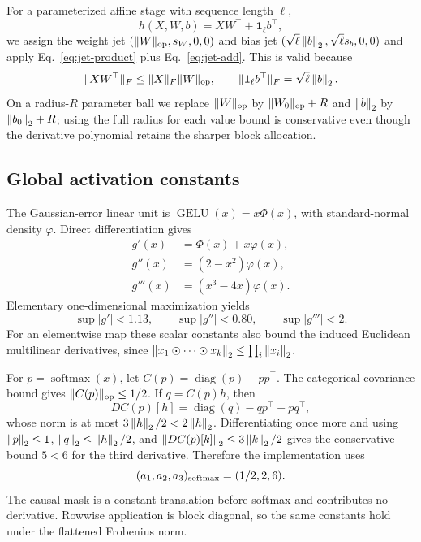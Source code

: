 For a parameterized affine stage with sequence length $\ell$,
\begin{equation}
 h(X,W,b)=XW^\top+\mathbf 1_\ell b^\top,
 \label{eq:affine-stage}
\end{equation}
we assign the weight jet $(\lVert W\rVert_{\rm op},s_W,0,0)$ and bias jet
$(\sqrt\ell\left\lVert b\right\rVert_2,\sqrt\ell s_b,0,0)$ and apply
Eq.~\eqref{eq:jet-product} plus Eq.~\eqref{eq:jet-add}.  This is valid because
\begin{equation}
 \lVert XW^\top\rVert_F\le\lVert X\rVert_F\lVert W\rVert_{\rm op},\qquad
 \lVert\mathbf 1_\ell b^\top\rVert_F=\sqrt\ell\left\lVert b\right\rVert_2.
 \label{eq:affine-norms}
\end{equation}
On a radius-$R$ parameter ball we replace $\lVert W\rVert_{\rm op}$ by
$\lVert W_0\rVert_{\rm op}+R$ and $\left\lVert b\right\rVert_2$ by $\left\lVert b_0\right\rVert_2+R$; using the full
radius for each value bound is conservative even though the derivative
polynomial retains the sharper block allocation.

\subsection{Global activation constants}

The Gaussian-error linear unit is
$\operatorname{GELU}(x)=x\Phi(x)$, with standard-normal density $\varphi$.
Direct differentiation gives
\begin{align}
g'(x)&=\Phi(x)+x\varphi(x),\nonumber\\
g''(x)&=(2-x^2)\varphi(x),\nonumber\\
g'''(x)&=(x^3-4x)\varphi(x).
\end{align}
Elementary one-dimensional maximization yields
\begin{equation}
 \sup|g'|<1.13,\qquad \sup|g''|<0.80,\qquad \sup|g'''|<2.
 \label{eq:gelu-constants}
\end{equation}
For an elementwise map these scalar constants also bound the induced
Euclidean multilinear derivatives, since
$\left\lVert x_1\odot\cdots\odot x_k\right\rVert_2\le\prod_i\left\lVert x_i\right\rVert_2$.

For $p=\operatorname{softmax}(x)$, let
$C(p)=\operatorname{diag}(p)-pp^\top$.  The categorical covariance bound gives
$\lVert C(p)\rVert_{\rm op}\le1/2$.  If $q=C(p)h$, then
\begin{equation}
 DC(p)[h]=\operatorname{diag}(q)-qp^\top-pq^\top,
\end{equation}
whose norm is at most $3\left\lVert h\right\rVert_2/2<2\left\lVert h\right\rVert_2$.  Differentiating once more and
using $\left\lVert p\right\rVert_2\le1$, $\left\lVert q\right\rVert_2\le\left\lVert h\right\rVert_2/2$, and
$\left\lVert DC(p)[k]\right\rVert_2\le3\left\lVert k\right\rVert_2/2$ gives the conservative bound $5<6$ for the
third derivative.  Therefore the implementation uses
\begin{equation}
 (a_1,a_2,a_3)_{\rm softmax}=(1/2,2,6).
 \label{eq:softmax-constants}
\end{equation}
The causal mask is a constant translation before softmax and contributes no
derivative.  Rowwise application is block diagonal, so the same constants hold
under the flattened Frobenius norm.

